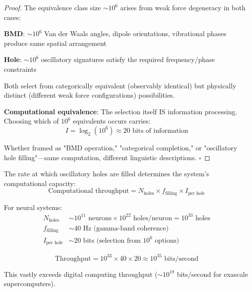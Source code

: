 \begin{proof}
The equivalence class size $\sim 10^6$ arises from weak force degeneracy in both cases:

\textbf{BMD}: $\sim 10^6$ Van der Waals angles, dipole orientations, vibrational phases produce same spatial arrangement

\textbf{Hole}: $\sim 10^6$ oscillatory signatures satisfy the required frequency/phase constraints

Both select from categorically equivalent (observably identical) but physically distinct (different weak force configurations) possibilities.

\textbf{Computational equivalence}: The selection itself IS information processing. Choosing which of $10^6$ equivalents occurs carries:
\begin{equation}
I = \log_2(10^6) \approx 20 \text{ bits of information}
\end{equation}

Whether framed as "BMD operation," "categorical completion," or "oscillatory hole filling"—same computation, different linguistic descriptions. $\square$
\end{proof}

\begin{proposition}
The rate at which oscillatory holes are filled determines the system's computational capacity:
\begin{equation}
\text{Computational throughput} = N_{\text{holes}} \times f_{\text{filling}} \times I_{\text{per hole}}
\end{equation}

For neural systems:
\begin{align}
N_{\text{holes}} &\sim 10^{11} \text{ neurons} \times 10^{22} \text{ holes/neuron} = 10^{33} \text{ holes} \\
f_{\text{filling}} &\sim 40 \text{ Hz (gamma-band coherence)} \\
I_{\text{per hole}} &\sim 20 \text{ bits (selection from } 10^6 \text{ options)}
\end{align}

\begin{equation}
\text{Throughput} = 10^{33} \times 40 \times 20 \approx 10^{35} \text{ bits/second}
\end{equation}

This vastly exceeds digital computing throughput ($\sim 10^{18}$ bits/second for exascale supercomputers).
\end{proposition}

